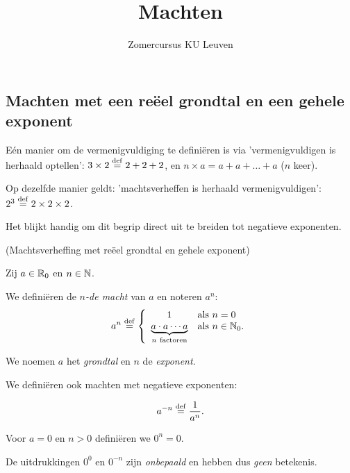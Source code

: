\documentclass{ximera}
\author{Zomercursus KU Leuven}
\title[Rekenvaardigheden:]{Machten}
\begin{document}
\begin{abstract}
	
\end{abstract}
\maketitle

\subsection{Machten met een re\"eel grondtal en een gehele exponent}

Eén manier om de vermenigvuldiging te definiëren is via 'vermenigvuldigen is herhaald optellen': $3\times 2 \overset{\mathrm{def}}{=} 2 + 2+ 2$, en $n\times a = a+a+\dots +a$ ($n$ keer). 

Op dezelfde manier geldt: 'machtsverheffen is herhaald vermenigvuldigen': $2^3 \overset{\mathrm{def}}{=} 2\times2\times2$. 

Het blijkt handig om dit begrip direct uit te breiden tot negatieve exponenten. 

\begin{definition}(Machtsverheffing met re\"eel grondtal en gehele exponent) \ 
	
	Zij $a\in\mathbb{R}_0$ en $n\in\mathbb{N}$. 
	
	We definiëren de \emph{$n$-de macht}  van $a$ en noteren $a^n$:
	\[a^n\overset{\mathrm{def}}{=}
	\left\{
	\begin{array}{cl}
	1 & \textrm{als }n=0 \\
	\underbrace{a\cdot a\cdots a}_{n\mathrm{\ factoren}} & \textrm{als }n\in\mathbb{N}_0. \\
	\end{array}
	\right.\]
	
	We noemen $a$ het \textit{grondtal} en $n$ de \textit{exponent}.
		
	We definiëren ook machten met negatieve exponenten:
	
	\[a^{-n}\overset{\mathrm{def}}{=}\frac{1}{a^n}.\]
	
	Voor $a=0$ en $n>0$ definiëren we $0^n = 0$. 
	
	De uitdrukkingen $0^0$ en $0^{-n}$ zijn \textit{onbepaald} en hebben dus \textit{geen} betekenis.
	
\end{definition}

\end{document}
